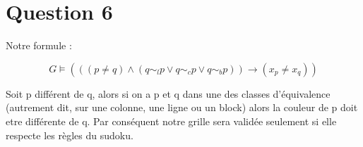 
\section{Question 6}

Notre formule : 

$$G \models ( ( ( p \neq q ) \wedge ( q \sim_{l} p \vee q \sim_{c} p \vee q \sim_{b} p) ) \rightarrow ( x_p \neq x_q )  )$$

Soit p diff\'erent de q, alors si on a p et q dans une des classes d'\'equivalence (autrement dit, sur une colonne, une ligne ou un block) alors la couleur de p doit etre diff\'erente de q. Par cons\'equent notre grille sera valid\'ee seulement si elle respecte les r\`egles du sudoku.